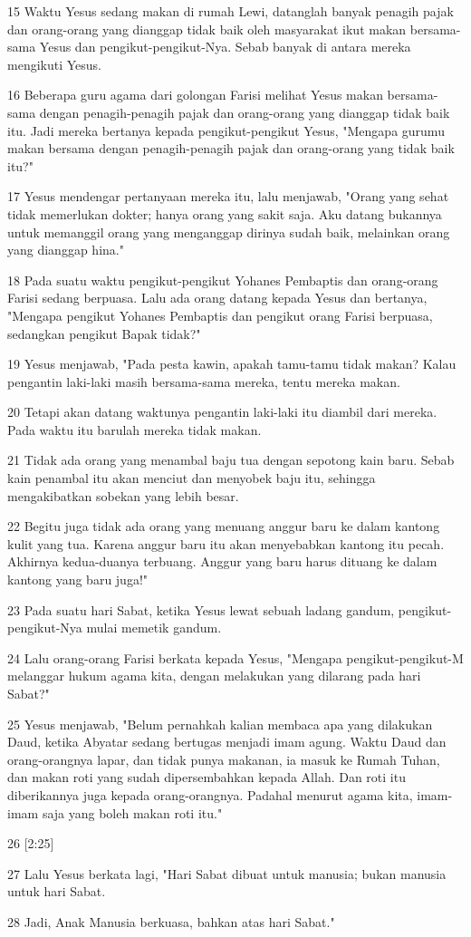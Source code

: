 \par 15 Waktu Yesus sedang makan di rumah Lewi, datanglah banyak penagih pajak dan orang-orang yang dianggap tidak baik oleh masyarakat ikut makan bersama-sama Yesus dan pengikut-pengikut-Nya. Sebab banyak di antara mereka mengikuti Yesus.
\par 16 Beberapa guru agama dari golongan Farisi melihat Yesus makan bersama-sama dengan penagih-penagih pajak dan orang-orang yang dianggap tidak baik itu. Jadi mereka bertanya kepada pengikut-pengikut Yesus, "Mengapa gurumu makan bersama dengan penagih-penagih pajak dan orang-orang yang tidak baik itu?"
\par 17 Yesus mendengar pertanyaan mereka itu, lalu menjawab, "Orang yang sehat tidak memerlukan dokter; hanya orang yang sakit saja. Aku datang bukannya untuk memanggil orang yang menganggap dirinya sudah baik, melainkan orang yang dianggap hina."
\par 18 Pada suatu waktu pengikut-pengikut Yohanes Pembaptis dan orang-orang Farisi sedang berpuasa. Lalu ada orang datang kepada Yesus dan bertanya, "Mengapa pengikut Yohanes Pembaptis dan pengikut orang Farisi berpuasa, sedangkan pengikut Bapak tidak?"
\par 19 Yesus menjawab, "Pada pesta kawin, apakah tamu-tamu tidak makan? Kalau pengantin laki-laki masih bersama-sama mereka, tentu mereka makan.
\par 20 Tetapi akan datang waktunya pengantin laki-laki itu diambil dari mereka. Pada waktu itu barulah mereka tidak makan.
\par 21 Tidak ada orang yang menambal baju tua dengan sepotong kain baru. Sebab kain penambal itu akan menciut dan menyobek baju itu, sehingga mengakibatkan sobekan yang lebih besar.
\par 22 Begitu juga tidak ada orang yang menuang anggur baru ke dalam kantong kulit yang tua. Karena anggur baru itu akan menyebabkan kantong itu pecah. Akhirnya kedua-duanya terbuang. Anggur yang baru harus dituang ke dalam kantong yang baru juga!"
\par 23 Pada suatu hari Sabat, ketika Yesus lewat sebuah ladang gandum, pengikut-pengikut-Nya mulai memetik gandum.
\par 24 Lalu orang-orang Farisi berkata kepada Yesus, "Mengapa pengikut-pengikut-M melanggar hukum agama kita, dengan melakukan yang dilarang pada hari Sabat?"
\par 25 Yesus menjawab, "Belum pernahkah kalian membaca apa yang dilakukan Daud, ketika Abyatar sedang bertugas menjadi imam agung. Waktu Daud dan orang-orangnya lapar, dan tidak punya makanan, ia masuk ke Rumah Tuhan, dan makan roti yang sudah dipersembahkan kepada Allah. Dan roti itu diberikannya juga kepada orang-orangnya. Padahal menurut agama kita, imam-imam saja yang boleh makan roti itu."
\par 26 [2:25]
\par 27 Lalu Yesus berkata lagi, "Hari Sabat dibuat untuk manusia; bukan manusia untuk hari Sabat.
\par 28 Jadi, Anak Manusia berkuasa, bahkan atas hari Sabat."

